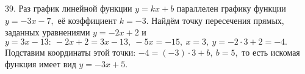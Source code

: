 39. Раз график линейной функции $y=kx+b$ параллелен графику функции $y=-3x-7,$ её коэффициент $k=-3.$ Найдём точку пересечения прямых, заданных уравнениями $y=-2x+2$ и $y=3x-13:\ -2x+2=3x-13,\ -5x=-15,\ x=3,\ y=-2\cdot3+2=-4.$ Подставим координаты этой точки: $-4=(-3)\cdot3+b,\ b=5,$ то есть искомая функция имеет вид $y=-3x+5.$\\
